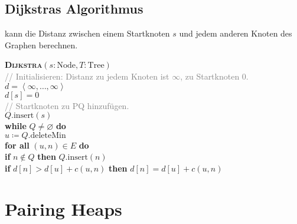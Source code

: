 \subsection{Dijkstras Algorithmus}

 kann die Distanz zwischen einem Startknoten \( s \) und jedem anderen Knoten des Graphen berechnen.

\begin{pseudocode}
  \textbf{\textsc{Dijkstra}}\( (s : \text{Node}, T : \text{Tree}) \) \\
  \textcolor{gray}{// Initialisieren: Distanz zu jedem Knoten ist \( \infty \), zu Startknoten \( 0 \).} \\
  \( d = \left\langle \infty,\ldots,\infty \right\rangle \) \\
  \( d[s] = 0 \) \\
  \textcolor{gray}{// Startknoten zu PQ hinzufügen.} \\
  \( Q\text{.insert}(s) \) \\
  \textbf{while} \( Q \neq \varnothing \) \textbf{do} \\
  \phantom{\enskip} \( u \coloneqq Q\text{.deleteMin} \) \\
  \phantom{\enskip} \textbf{for all} \( (u,n) \in E \) \textbf{do} \\
  \phantom{\enskip} \phantom{\enskip} \textbf{if} \( n \not \in Q \) \textbf{then} \( Q\text{.insert}(n) \) \\
  \phantom{\enskip} \phantom{\enskip} \textbf{if} \( d[n] > d[u] + c(u,n) \) \textbf{then} \( d[n] = d[u] + c(u,n) \) \\
\end{pseudocode}

\section{Pairing Heaps}

